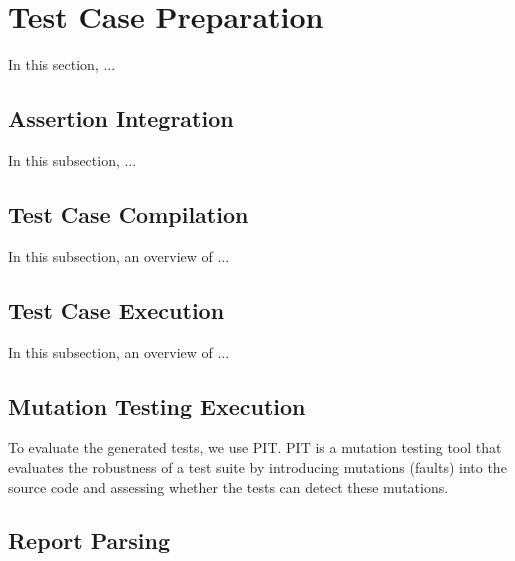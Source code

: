 \section{Test Case Preparation}
\label{sec:test_case_preparation}
\vspace{0.2 cm}

In this section, ...

\vspace{0.1 cm}
\subsection{Assertion Integration}
\label{sec:assertion_integration}
\vspace{0.1 cm}

In this subsection, ...

\vspace{0.1 cm}
\subsection{Test Case Compilation}
\label{sec:test_compilation}
\vspace{0.1 cm}

In this subsection, an overview of ...

\vspace{0.1 cm}
\subsection{Test Case Execution}
\label{sec:test_execution}
\vspace{0.1 cm}

In this subsection, an overview of ...

\vspace{0.1 cm}
\subsection{Mutation Testing Execution}
\label{sec:mutation_testing_execution}
\vspace{0.1 cm}

To evaluate the generated tests, we use PIT\cite{noauthor_pit_nodate}. PIT is a mutation testing tool that evaluates the robustness of a test suite by introducing mutations (faults) into the source code and assessing whether the tests can detect these mutations.

\vspace{0.1 cm}
\subsection{Report Parsing}
\label{sec:report_parsing}
\vspace{0.1 cm}

